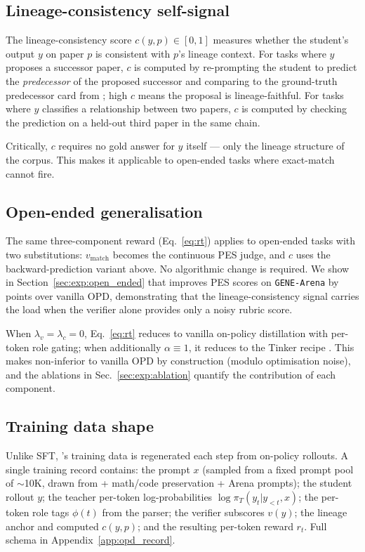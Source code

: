 \subsection{Lineage-consistency self-signal}
\label{sec:method:lineage}

The lineage-consistency score $c(y, p) \in [0, 1]$ measures whether the
student's output $y$ on paper $p$ is consistent with $p$'s lineage
context. For tasks where $y$ proposes a successor paper, $c$ is computed
by re-prompting the student to predict the \emph{predecessor} of the
proposed successor and comparing to the ground-truth predecessor card
from \genetrace; high $c$ means the proposal is lineage-faithful. For
tasks where $y$ classifies a relationship between two papers, $c$ is
computed by checking the prediction on a held-out third paper in the
same chain.

Critically, $c$ requires no gold answer for $y$ itself --- only the
lineage structure of the \genetrace{} corpus. This makes it applicable
to open-ended tasks where exact-match cannot fire.

\subsection{Open-ended generalisation}
\label{sec:method:open}

The same three-component reward (Eq.~\ref{eq:rt}) applies to open-ended
tasks with two substitutions: $v_{\mathrm{match}}$ becomes the continuous
PES judge, and $c$ uses the backward-prediction variant above. No
algorithmic change is required. We show in
Section~\ref{sec:exp:open_ended} that \evoopd{} improves PES scores on
\geneexam{} \texttt{GENE-Arena} by  points over vanilla OPD,
demonstrating that the lineage-consistency signal carries the load when
the verifier alone provides only a noisy rubric score.

When $\lambda_v = \lambda_c = 0$, Eq.~\ref{eq:rt} reduces to vanilla
on-policy distillation with per-token role gating; when additionally
$\alpha \equiv 1$, it reduces to the Tinker recipe \citep{tinker_opd_2025}.
This makes \evoopd{} non-inferior to vanilla OPD by construction (modulo
optimisation noise), and the ablations in Sec.~\ref{sec:exp:ablation}
quantify the contribution of each component.

\subsection{Training data shape}
\label{sec:method:data}

Unlike SFT, \evoopd's training data is regenerated each step from
on-policy rollouts. A single training record contains: the prompt $x$
(sampled from a fixed prompt pool of $\sim$10K, drawn from \genetrace{}
+ math/code preservation + \geneexam{} Arena prompts); the student
rollout $y$; the teacher per-token log-probabilities $\log \pi_T(y_t |
y_{<t}, x)$; the per-token role tags $\phi(t)$ from the parser; the
verifier subscores $v(y)$; the lineage anchor and computed $c(y, p)$;
and the resulting per-token reward $r_t$. Full schema in
Appendix~\ref{app:opd_record}.

